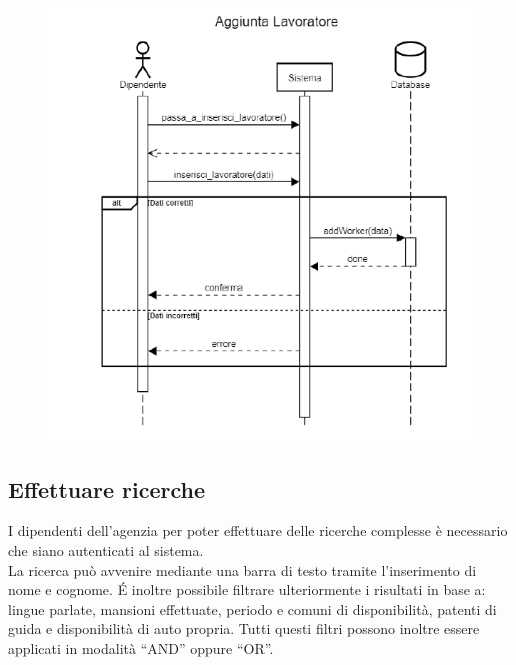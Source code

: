 \documentclass[a4paper, oneside, 12pt]{book}
\begin{document}
\begin{figure}[h!]
	\centering
	\includegraphics[width = 10 cm]{images/aggiunta}
	\label{fig:Inserimento lavoratore}
\end{figure}

\newpage\subsection{Effettuare ricerche}
I dipendenti dell’agenzia per poter effettuare delle ricerche complesse è necessario che siano autenticati al sistema. \\
La ricerca può avvenire mediante una barra di testo tramite l’inserimento di nome e cognome.
\'E inoltre possibile filtrare ulteriormente i risultati in base a: lingue parlate, mansioni effettuate, periodo e comuni di disponibilità,
patenti di guida e disponibilità di auto propria. Tutti questi filtri possono inoltre essere applicati in modalità “AND” oppure “OR”. \\

\end{document}
